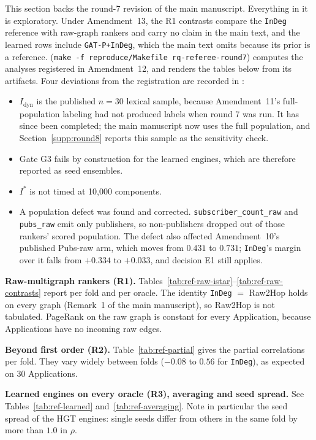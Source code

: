 \documentclass[preprint,3p]{elsarticle}
\begin{document}
This section backs the round-7 revision of the main manuscript. Everything in it is exploratory. Under Amendment~13, the R1 contrasts compare the \texttt{InDeg} reference with raw-graph rankers and carry no claim in the main text, and the learned rows include \texttt{GAT-P+InDeg}, which the main text omits because its prior is a reference.  (\texttt{make -f reproduce/Makefile rq-referee-round7}) computes the analyses registered in Amendment~12, and  renders the tables below from its artifacts. Four deviations from the registration are recorded in :
\begin{itemize}
    \item $I_{\text{dyn}}$ is the published $n = 30$ lexical sample, because Amendment~11's full-population labeling had not produced labels when round 7 was run. It has since been completed; the main manuscript now uses the full population, and Section~\ref{supp:round8} reports this sample as the sensitivity check.
    \item Gate G3 fails by construction for the learned engines, which are therefore reported as seed ensembles.
    \item $I^*$ is not timed at 10{,}000 components.
    \item A population defect was found and corrected. \texttt{subscriber\_count\_raw} and \texttt{pubs\_raw} emit only publishers, so non-publishers dropped out of those rankers' scored population. The defect also affected Amendment~10's published Pubs-raw arm, which moves from $0.431$ to $0.731$; \texttt{InDeg}'s margin over it falls from $+0.334$ to $+0.033$, and decision E1 still applies.
\end{itemize}

\noindent\textbf{Raw-multigraph rankers (R1).} Tables~\ref{tab:ref-raw-istar}--\ref{tab:ref-raw-contrasts} report per fold and per oracle. The identity \texttt{InDeg} $=$ Raw2Hop holds on every graph (Remark~1 of the main manuscript), so Raw2Hop is not tabulated. PageRank on the raw graph is constant for every Application, because Applications have no incoming raw edges.

\noindent\textbf{Beyond first order (R2).} Table~\ref{tab:ref-partial} gives the partial correlations per fold. They vary widely between folds ($-0.08$ to $0.56$ for \texttt{InDeg}), as expected on $30$ Applications.

\noindent\textbf{Learned engines on every oracle (R3), averaging and seed spread.} See Tables~\ref{tab:ref-learned} and~\ref{tab:ref-averaging}. Note in particular the seed spread of the HGT engines: single seeds differ from others in the same fold by more than $1.0$ in $\rho$.
\end{document}
